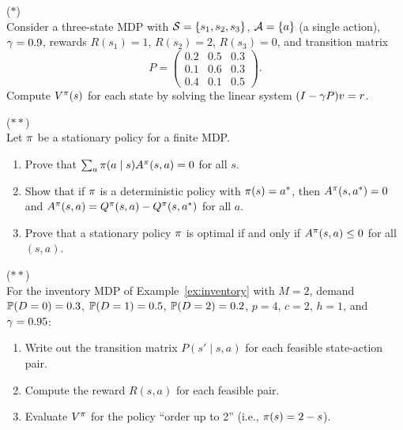 \documentclass[11pt,a4paper]{article}
\begin{document}
\begin{exercise} \textnormal{(\(*\))} \\
Consider a three-state MDP with $\mathcal{S} = \{s_1, s_2, s_3\}$,
$\mathcal{A} = \{a\}$ (a single action), $\gamma = 0.9$, rewards
$R(s_1) = 1$, $R(s_2) = 2$, $R(s_3) = 0$, and transition matrix
\[
    P = \begin{pmatrix}
    0.2 & 0.5 & 0.3 \\
    0.1 & 0.6 & 0.3 \\
    0.4 & 0.1 & 0.5
    \end{pmatrix}.
\]
Compute $V^{\pi}(s)$ for each state by solving the linear system
$(I - \gamma P) v = r$.
\end{exercise}

\begin{exercise}
\textnormal{(\(**\))} \\
Let $\pi$ be a stationary policy for a finite MDP.
\begin{enumerate}[label=(\alph*)]
    \item Prove that $\sum_{a} \pi(a \mid s) A^\pi(s,a) = 0$
    for all $s$.
    \item Show that if $\pi$ is a deterministic policy with
    $\pi(s) = a^*$, then $A^\pi(s, a^*) = 0$ and
    $A^\pi(s, a) = Q^{\pi}(s,a) - Q^{\pi}(s, a^*)$ for all $a$.
    \item Prove that a stationary policy $\pi$ is optimal if and
    only if $A^\pi(s,a) \leq 0$ for all $(s,a)$.
\end{enumerate}
\end{exercise}

\begin{exercise} \textnormal{(\(**\))} \\
For the inventory MDP of Example~\ref{ex:inventory} with $M = 2$,
demand $\mathbb{P}(D = 0) = 0.3$, $\mathbb{P}(D = 1) = 0.5$,
$\mathbb{P}(D = 2) = 0.2$, $p = 4$, $c = 2$, $h = 1$, and
$\gamma = 0.95$:
\begin{enumerate}[label=(\alph*)]
    \item Write out the transition matrix $P(s' \mid s, a)$ for each
    feasible state-action pair.
    \item Compute the reward $R(s,a)$ for each feasible pair.
    \item Evaluate $V^{\pi}$ for the policy ``order up to 2'' (i.e.,
    $\pi(s) = 2 - s$).
\end{enumerate}
\end{exercise}
\end{document}
